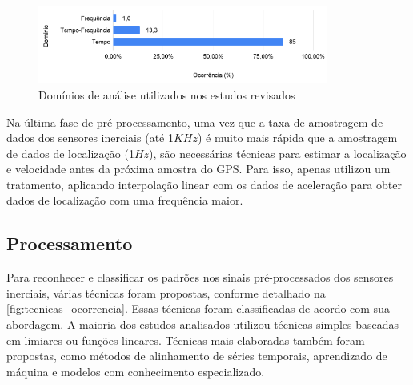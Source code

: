 \begin{figure}[h!]
  \centering
  \caption{Domínios de análise utilizados nos estudos revisados}
   \label{fig:dominios_analise_ocorrencia}
   \includegraphics[width=0.85\textwidth]{figuras/fig_18.png}
\end{figure}

Na última fase de pré-processamento, uma vez que a taxa de amostragem de dados dos sensores inerciais (até 1$KHz$) é muito mais rápida que a amostragem de dados de localização (1$Hz$), são necessárias técnicas para estimar a localização e velocidade antes da próxima amostra do GPS. Para isso, apenas \cite{Li2018} utilizou um tratamento, aplicando interpolação linear com os dados de aceleração para obter dados de localização com uma frequência maior. 

\subsection{Processamento}

Para reconhecer e classificar os padrões nos sinais pré-processados dos sensores inerciais, várias técnicas foram propostas, conforme detalhado na \autoref{fig:tecnicas_ocorrencia}. Essas técnicas foram classificadas de acordo com sua abordagem. A maioria dos estudos analisados utilizou técnicas simples baseadas em limiares ou funções lineares. Técnicas mais elaboradas também foram propostas, como métodos de alinhamento de séries temporais, aprendizado de máquina e modelos com conhecimento especializado.

